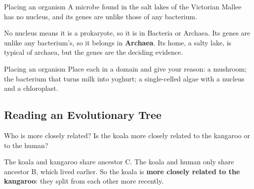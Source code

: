 \begin{workedex}{Placing an organism}
A microbe found in the salt lakes of the Victorian Mallee has no nucleus, and its genes are unlike those of any bacterium.

\smallskip
No nucleus means it is a prokaryote, so it is in Bacteria or Archaea. Its genes are unlike any bacterium's, so it belongs in \textbf{Archaea}. Its home, a salty lake, is typical of archaea, but the genes are the deciding evidence.
\end{workedex}

\begin{wedo}{Placing an organism}
Place each in a domain and give your reason: a mushroom; the bacterium that turns milk into yoghurt; a single-celled algae with a nucleus and a chloroplast.
\answerbox{4.5cm}
\end{wedo}

\subsection{Reading an Evolutionary Tree}\label{sub:a2.2}

\begin{center}
\end{center}

\begin{workedex}{Who is more closely related?}
Is the koala more closely related to the kangaroo or to the human?

\smallskip
The koala and kangaroo share ancestor C. The koala and human only share ancestor B, which lived earlier. So the koala is \textbf{more closely related to the kangaroo}: they split from each other more recently.
\end{workedex}

